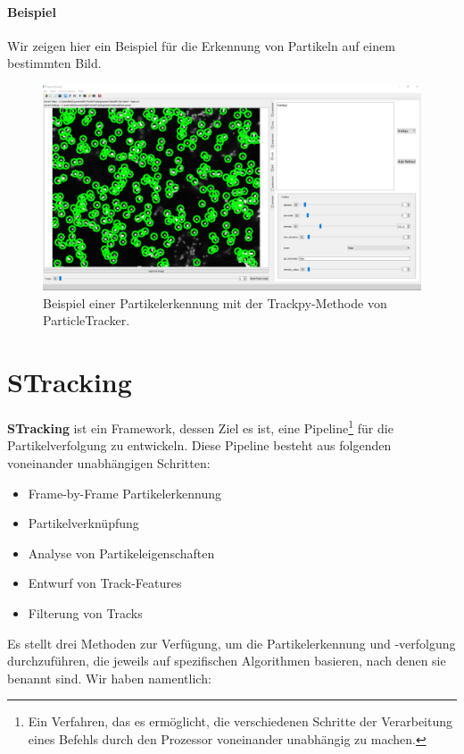 	\paragraph{Beispiel\\}
	Wir zeigen hier ein Beispiel für die Erkennung von Partikeln auf einem bestimmten Bild.
	 
	\begin{figure}[H]
    \centering
    \includegraphics[scale=0.3]{Grafiken/particletracker/Using trackpy.png}
    \caption{Beispiel einer Partikelerkennung mit der Trackpy-Methode von ParticleTracker.}
    \label{fig:kap1_PT_Beispiel}
\end{figure}

\newpage
	
\section{STracking}
\textbf{STracking} ist ein Framework, dessen Ziel es ist, eine Pipeline\footnote{Ein Verfahren, das es ermöglicht, die verschiedenen Schritte der Verarbeitung eines Befehls durch den Prozessor voneinander unabhängig zu machen.} für die Partikelverfolgung zu entwickeln. Diese Pipeline besteht aus folgenden voneinander unabhängigen Schritten:
\begin{itemize}
\item Frame-by-Frame Partikelerkennung
\item Partikelverknüpfung
\item Analyse von Partikeleigenschaften 
\item Entwurf von Track-Features
\item Filterung von Tracks
\end{itemize}

Es stellt drei Methoden zur Verfügung, um die Partikelerkennung und -verfolgung durchzuführen, die jeweils auf spezifischen Algorithmen basieren, nach denen sie benannt sind.  Wir haben namentlich:


